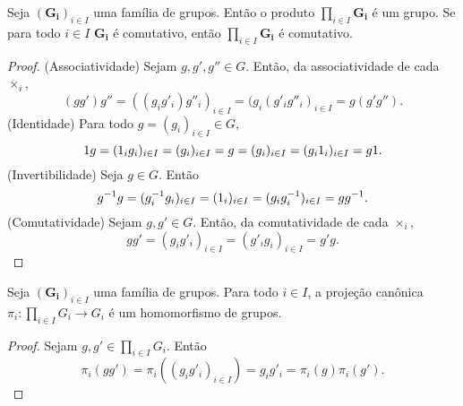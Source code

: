 \begin{proposition}
\label{alge:prop.gru.prod}
Seja $(\bm{G_i})_{i \in I}$ uma família de grupos. Então o produto $\prod_{i \in I} \bm{G_i}$ é um grupo. Se para todo $i \in I$ $\bm{G_i}$ é comutativo, então $\prod_{i \in I} \bm{G_i}$ é comutativo.
\end{proposition}
\begin{proof}
(Associatividade) Sejam $g,g',g'' \in G$. Então, da associatividade de cada $\times_i$,
		\begin{equation*}
		(gg')g'' = ((g_ig'_i)g''_i)_{i \in I} = (g_i(g'_ig''_i)_{i \in I} = g(g'g'').
		\end{equation*}
	(Identidade) Para todo $g=(g_i)_{i \in I} \in G$,
		\begin{equation*}
		1 g = (1_ig_i)_{i \in I} = (g_i)_{i \in I} = g = (g_i)_{i \in I} =(g_i1_i)_{i \in I} = g1.
		\end{equation*}
	(Invertibilidade) Seja $g \in G$. Então
	\begin{equation*}
	g^{-1} g = (g_i^{-1} g_i)_{i \in I} = (1_i)_{i \in I} = (g_ig_i^{-1})_{i \in I} = gg^{-1}.
	\end{equation*}
	(Comutatividade) Sejam $g,g' \in G$. Então, da comutatividade de cada $ \times _i$,
	\begin{equation*}
	gg' = (g_ig'_i)_{i \in I} = (g'_ig_i)_{i \in I} = g'g.
	\end{equation*}
\end{proof}

\begin{proposition}
Seja $(\bm{G_i})_{i \in I}$ uma família de grupos. Para todo $i \in I$, a projeção canônica $\pi_i: \prod_{i \in I} G_i \to G_i$ é um homomorfismo de grupos.
\end{proposition}
\begin{proof}
Sejam $g,g' \in \prod_{i \in I} G_i$. Então
	\begin{equation*}
	\pi_i(gg') = \pi_i((g_ig'_i)_{i \in I}) = g_ig'_i = \pi_i(g)\pi_i(g').
	\end{equation*}
\end{proof}

